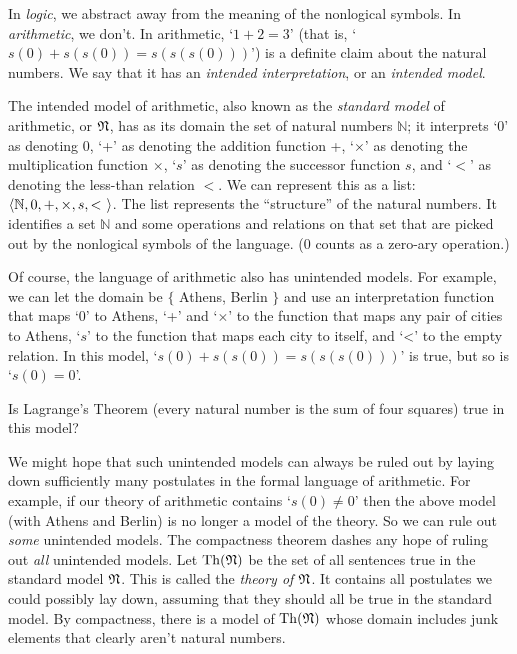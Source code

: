 In \emph{logic}, we abstract away from the meaning of the nonlogical symbols.
In \emph{arithmetic}, we don't.
In arithmetic, `$1+2=3$'
(that is, `$s(0) + s(s(0)) = s(s(s(0)))$')
is a definite claim about the natural numbers.
We say that it has an \emph{intended interpretation},
or an \emph{intended model}.

The intended model of arithmetic,
also known as the \emph{standard model} of arithmetic, or $\mathfrak{N}$,
has as its domain
the set of natural numbers $\mathbb{N}$;
it interprets `0' as denoting 0,
`+' as denoting the addition function +,
`$\times$' as denoting the multiplication function $\times$,
`$s$' as denoting the successor function $s$, and
`$<$' as denoting the less-than relation $<$.
We can represent this as a list:
$\t{\mathbb{N}, 0, +, \times, s, <}$.
The list represents the ``structure'' of the natural numbers.
It identifies a set $\mathbb{N}$
and some operations and relations on that set
that are picked out by the nonlogical symbols of the language.
(0 counts as a zero-ary operation.)

Of course,
the language of arithmetic also has unintended models.
For example,
we can let the domain be $\{$ Athens, Berlin $\}$
and use an interpretation function that maps
`0' to Athens,
`+' and `$\times$' to the function that maps any pair of cities to Athens,
`$s$' to the function that maps each city to itself,
and
`<' to the empty relation.
In this model,
`$s(0) + s(s(0)) = s(s(s(0)))$' is true,
but so is `$s(0) = 0$'.

\begin{exercise}
  Is Lagrange's Theorem (every natural number is the sum of four squares) true in this model?
\end{exercise}

We might hope that
such unintended models can always be ruled out
by laying down sufficiently many postulates in the formal language of arithmetic.
For example,
if our theory of arithmetic contains `$s(0) \ne 0$'
then the above model (with Athens and Berlin) is no longer a model of the theory.
So we can rule out \emph{some} unintended models.
The compactness theorem dashes any hope
of ruling out \emph{all} unintended models.
Let $\mathrm{Th}(\mathfrak{N})$ be the set of all sentences true in
the standard model $\mathfrak{N}$.
This is called the \emph{theory of $\mathfrak{N}$}.
It contains all postulates we could possibly lay down,
assuming that they should all be true in the standard model.
By compactness,
there is a model of $\mathrm{Th}(\mathfrak{N})$ whose domain
includes junk elements that clearly aren't natural numbers.

